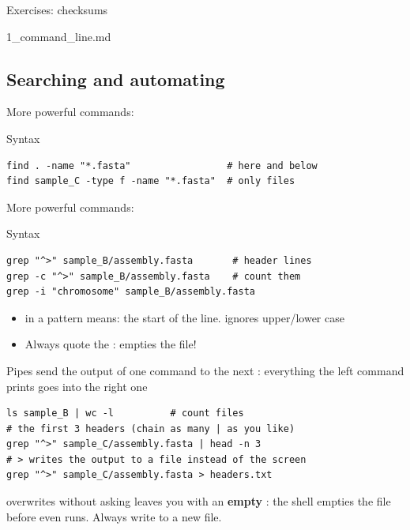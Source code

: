 \begin{frame}{Exercises: checksums}
\begin{exlist}{1_command_line.md}
\end{exlist}
\end{frame}

\subsection{Searching and automating}
\begin{frame}[fragile]{More powerful commands: }
\begin{block}{Syntax}
\end{block}
\begin{lstlisting}
find . -name "*.fasta"                 # here and below
find sample_C -type f -name "*.fasta"  # only files
\end{lstlisting}
\end{frame}

\begin{frame}[fragile]{More powerful commands: }
\begin{block}{Syntax}
\end{block}
\begin{lstlisting}
grep "^>" sample_B/assembly.fasta       # header lines
grep -c "^>" sample_B/assembly.fasta    # count them
grep -i "chromosome" sample_B/assembly.fasta
\end{lstlisting}
\small
\begin{itemize}
    \item \cmd{^} in a pattern means: the start of the line.
           ignores upper/lower case
    \item \alert{Always quote the \cmd{>}}: \mbox{} empties the file!
\end{itemize}
\end{frame}

\begin{frame}[fragile]{Pipes send the output of one command to the next}
: everything the left command prints goes into the right one
\begin{lstlisting}
ls sample_B | wc -l          # count files
# the first 3 headers (chain as many | as you like)
grep "^>" sample_C/assembly.fasta | head -n 3
# > writes the output to a file instead of the screen
grep "^>" sample_C/assembly.fasta > headers.txt
\end{lstlisting}

\medskip
\begin{alertblock}{\cmd{>} overwrites without asking}
     leaves you with an \textbf{empty} :
    the shell empties the file before  even runs.
    Always write to a new file.
\end{alertblock}
\end{frame}

